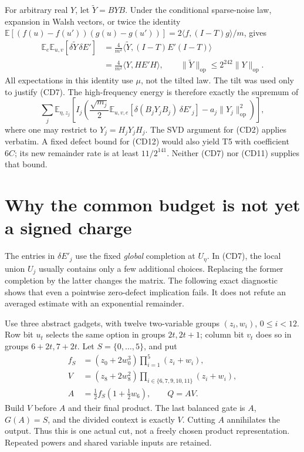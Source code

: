 \documentclass[11pt]{article}
\newcommand{\E}{\mathbb E}
\newcommand{\op}{\mathrm{op}}
\begin{document}
For arbitrary real $Y$, let $\widetilde Y=BYB$. Under the
conditional sparse-noise law, expansion in Walsh vectors, or
twice the identity
$\E[(f(u)-f(u'))(g(u)-g(u'))]
 =2\langle f,(I-T)g\rangle/m$, gives
\[
 \begin{split}
 \E_e\E_{u,v}[\delta\widetilde Y\,\delta E']
  &=\frac4{m^2}\langle\widetilde Y,(I-T)E'(I-T)\rangle\\
  &=\frac4{m^2}\langle Y,HE'H\rangle,\qquad
 \|\widetilde Y\|_{\op}\le2^{242}\|Y\|_{\op}.             \tag{CD11}
 \end{split}
\]
All expectations in this identity use $\mu$, not the tilted law.
The tilt was used only to justify (CD7).
The high-frequency energy is therefore exactly the supremum of
\[
 \sum_j\E_{\eta,z_j}\left[I_j\left(
  \frac{\sqrt{m_j}}2
       \E_{u,v,e}[\delta(B_jY_jB_j)\,\delta E'_j]
              -a_j\|Y_j\|_{\op}^2\right)\right],         \tag{CD12}
\]
where one may restrict to $Y_j=H_jY_jH_j$.
The SVD argument for (CD2) applies verbatim.
A fixed defect bound for (CD12) would also yield T5 with coefficient
$6C$; its new remainder rate is at least $11/2^{141}$.
Neither (CD7) nor (CD11) supplies that bound.

\section{Why the common budget is not yet a signed charge}
The entries in $\delta E'_j$ use the fixed \emph{global} completion
at $U_\eta$. In (CD7), the local union $U_j$ usually contains
only a few additional choices. Replacing the former completion by
the latter changes the matrix. The following exact diagnostic
shows that even a pointwise zero-defect implication fails.
It does not refute an averaged estimate with an exponential remainder.

Use three abstract gadgets, with twelve two-variable groups
$(z_i,w_i)$, $0\le i<12$. Row bit $u_t$ selects the same
option in groups $2t,2t+1$; column bit $v_t$ does so in
groups $6+2t,7+2t$. Let $S=\{0,\ldots,5\}$, and put
\[
 \begin{split}
 f_S&=(z_0+2w_0^3)\prod_{i=1}^{5}(z_i+w_i),\\
 V&=(z_8+2w_8^2)
                  \prod_{i\in\{6,7,9,10,11\}}(z_i+w_i),\\
 A&=\tfrac12 f_S(1+\tfrac12w_6),\qquad Q=AV.            \tag{CD13}
 \end{split}
\]
Build $V$ before $A$ and their final product. The last balanced
gate is $A$, $G(A)=S$, and the divided context is exactly $V$.
Cutting $A$ annihilates the output. Thus this is one actual cut,
not a freely chosen product representation. Repeated powers and
shared variable inputs are retained.
\end{document}
